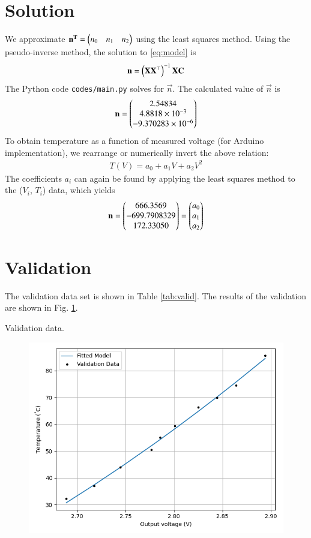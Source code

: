 \documentclass[journal,12pt,onecolumn]{IEEEtran}
\begin{document}
\section{\textbf{Solution}}
We approximate $\mathbf{n^T} = \begin{pmatrix}n_0 & n_1 & n_2\end{pmatrix}$ using the least squares method. Using the pseudo-inverse method, the solution to \eqref{eq:model} is
\begin{align}
    \mathbf{n} = \left(\mathbf{XX}^\top\right)^{-1}\mathbf{X}\mathbf{C}
\end{align}
The Python code \texttt{codes/main.py} solves for $\vec{n}$.
The calculated value of $\vec{n}$ is
\begin{align}
    \mathbf{n} = \begin{pmatrix}2.54834\\4.8818\times10^{-3}\\-9.370283\times10^{-6}\end{pmatrix}
    \label{eq:opt-theta-1}
\end{align}
To obtain temperature as a function of measured voltage (for Arduino implementation), we rearrange or numerically invert the above relation:
\begin{align}
T(V) = a_0 + a_1V + a_2V^2
\end{align}
The coefficients $a_i$ can again be found by applying the least squares method to the ($V_i$, $T_i$)
data, which yields
\begin{align}
    \mathbf{n} = \begin{pmatrix}666.3569\\-699.7908329\\172.33050\end{pmatrix} = \begin{pmatrix}a_0 \\ a_1 \\ a_2\end{pmatrix}
    \label{eq:opt-theta-2}
\end{align}


\section{\textbf{Validation}}
The validation data set is shown in Table \ref{tab:valid}. The results of the
validation are shown in Fig. \ref{fig:valid}.
\begin{table}[H]
    \centering
    
    \caption{Validation data.}
    \label{tab:valid}
\end{table}
\begin{figure}[H]
    \centering
    \includegraphics[width=0.6\columnwidth]{figs/temp_vs_voltage/valid.png}
    \label{fig:valid}
\end{figure}
\end{document}
